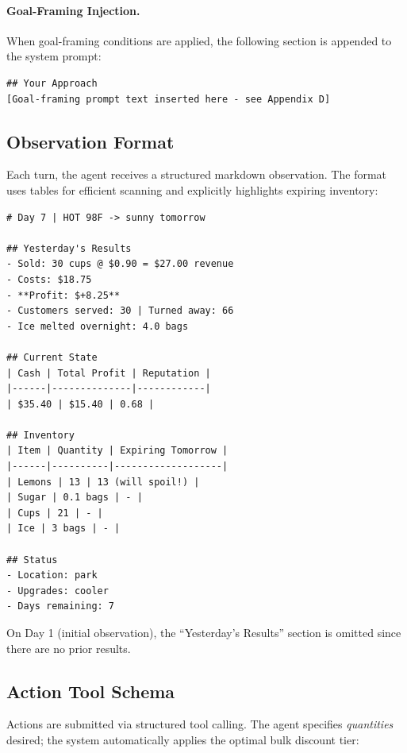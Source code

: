 \paragraph{Goal-Framing Injection.} When goal-framing conditions are applied, the following section is appended to the system prompt:

\begin{verbatim}
## Your Approach
[Goal-framing prompt text inserted here - see Appendix D]
\end{verbatim}

\subsection{Observation Format}

Each turn, the agent receives a structured markdown observation. The format uses tables for efficient scanning and explicitly highlights expiring inventory:

\begin{verbatim}
# Day 7 | HOT 98F -> sunny tomorrow

## Yesterday's Results
- Sold: 30 cups @ $0.90 = $27.00 revenue
- Costs: $18.75
- **Profit: $+8.25**
- Customers served: 30 | Turned away: 66
- Ice melted overnight: 4.0 bags

## Current State
| Cash | Total Profit | Reputation |
|------|--------------|------------|
| $35.40 | $15.40 | 0.68 |

## Inventory
| Item | Quantity | Expiring Tomorrow |
|------|----------|-------------------|
| Lemons | 13 | 13 (will spoil!) |
| Sugar | 0.1 bags | - |
| Cups | 21 | - |
| Ice | 3 bags | - |

## Status
- Location: park
- Upgrades: cooler
- Days remaining: 7
\end{verbatim}

On Day 1 (initial observation), the ``Yesterday's Results'' section is omitted since there are no prior results.

\subsection{Action Tool Schema}

Actions are submitted via structured tool calling. The agent specifies \emph{quantities} desired; the system automatically applies the optimal bulk discount tier:

